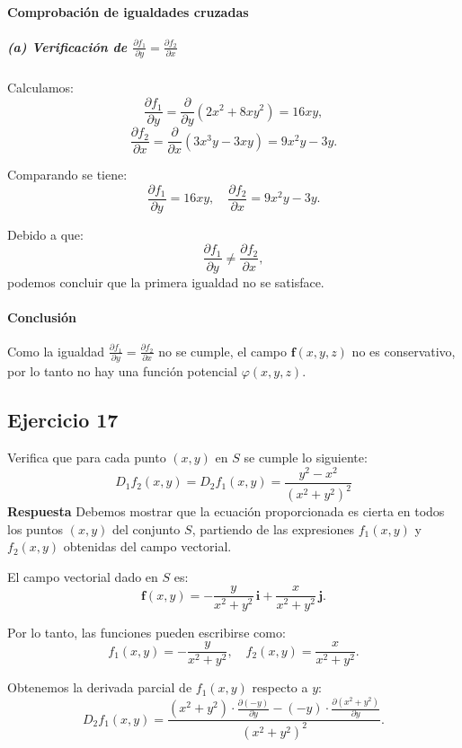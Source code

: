 \documentclass{report}
\begin{document}
\paragraph{Comprobación de igualdades cruzadas}

\subparagraph{(a) Verificación de \( \frac{\partial f_1}{\partial y} = \frac{\partial f_2}{\partial x} \)}

Calculamos:
\[
\frac{\partial f_1}{\partial y} = \frac{\partial}{\partial y} \left(2x^2 + 8xy^2\right) = 16xy,
\]
\[
\frac{\partial f_2}{\partial x} = \frac{\partial}{\partial x} \left(3x^3y - 3xy\right) = 9x^2y - 3y.
\]

Comparando se tiene:
\[
\frac{\partial f_1}{\partial y} = 16xy, \quad \frac{\partial f_2}{\partial x} = 9x^2y - 3y.
\]

Debido a que:
\[
\frac{\partial f_1}{\partial y} \neq \frac{\partial f_2}{\partial x},
\]
podemos concluir que la primera igualdad no se satisface.

\paragraph{Conclusión}
Como la igualdad \( \frac{\partial f_1}{\partial y} = \frac{\partial f_2}{\partial x} \) no se cumple, el campo \(\mathbf{f}(x, y, z)\) no es conservativo, por lo tanto no hay una función potencial \( \varphi(x, y, z) \).

\subsection*{Ejercicio 17}
Verifica que para cada punto \((x, y)\) en \(S\) se cumple lo siguiente:
$$
D_1 f_2(x, y) = D_2 f_1(x, y) = \frac{y^2 - x^2}{\left(x^2 + y^2\right)^2}
$$
\textbf{Respuesta}
Debemos mostrar que la ecuación proporcionada es cierta en todos los puntos \((x, y)\) del conjunto \(S\), partiendo de las expresiones \(f_1(x, y)\) y \(f_2(x, y)\) obtenidas del campo vectorial.



El campo vectorial dado en \(S\) es:
\[
\mathbf{f}(x, y) = -\frac{y}{x^2 + y^2} \, \mathbf{i} + \frac{x}{x^2 + y^2} \, \mathbf{j}.
\]

Por lo tanto, las funciones pueden escribirse como:
\[
f_1(x, y) = -\frac{y}{x^2 + y^2}, \quad f_2(x, y) = \frac{x}{x^2 + y^2}.
\]



Obtenemos la derivada parcial de \(f_1(x, y)\) respecto a \(y\):
\[
D_2 f_1(x, y) = \frac{\left(x^2 + y^2\right) \cdot \frac{\partial(-y)}{\partial y} - (-y) \cdot \frac{\partial(x^2 + y^2)}{\partial y}}{\left(x^2 + y^2\right)^2}.
\]
\end{document}
